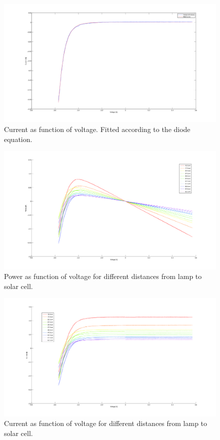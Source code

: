 \documentclass[a4paper]{article}
\begin{document}
\begin{figure}[h!]
  \label{ivsun}
  \begin{center}
    \includegraphics[scale=0.2]{IvsUnoIlumination.jpg}
  \end{center}
  \caption{Current as function of voltage. Fitted according to the diode equation.}
\end{figure}
\begin{figure}[h!]
  \label{pvsv}
  \begin{center}
    \includegraphics[scale=0.2]{PvsV.jpg}
  \end{center}
  \caption{Power as function of voltage for different distances from lamp to solar cell.}
\end{figure}
\begin{figure}[h!]
  \label{ivsu}
  \begin{center}
    \includegraphics[scale=0.2]{IvsU.jpg}
  \end{center}
  \caption{Current as function of voltage for different distances from lamp to solar cell.}
\end{figure}
\end{document}
